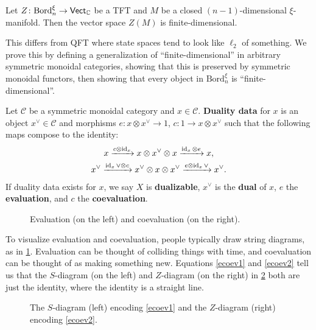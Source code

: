 \begin{theorem}\label{finitestate} 
    Let $Z \colon \mathrm{Bord}_n^{\xi} \to \mathsf{Vect} _{\mathbb{C}}$ be a TFT and $M$ be a closed $(n-1)$-dimensional $\xi$-manifold. Then the vector space $Z(M)$ is finite-dimensional.
\end{theorem}
This differs from QFT where state spaces tend to look like $\ell_2$ of something. We prove this by defining a generalization of ``finite-dimensional'' in arbitrary symmetric monoidal categories, showing that this is preserved by symmetric monoidal functors, then showing that every object in $\mathrm{Bord}_n ^{\xi}$ is ``finite-dimensional''.

\begin{definition}[]
    Let $\mathcal{C} $ be a symmetric monoidal category and $x \in \mathcal{C} $. \textbf{Duality data} for $x$ is an object $x ^{\vee} \in \mathcal{C} $ and morphisms $e \colon x \otimes x^{\vee} \to 1$, $c \colon 1 \to x \otimes x^{\vee}$ such that the following maps compose to the identity:
    \begin{gather}
       x \xrightarrow{c \otimes \operatorname{id}_x} x \otimes x^{\vee}\otimes x \xrightarrow{\operatorname{id}_x \otimes e} x,\label{ecoev1} \\ 
       x^{\vee}\xrightarrow{\operatorname{id}_x\vee \otimes c} x^{\vee}\otimes x \otimes x^{\vee}\xrightarrow{e\otimes \operatorname{id}_x \vee} x^{\vee}.\label{ecoev2} 
    \end{gather}
    If duality data exists for $x$, we say $X$ is \textbf{dualizable}, $x^{\vee}$ is the \textbf{dual} of $x$, $e$ the \textbf{evaluation}, and $c$ the \textbf{coevaluation}.
\end{definition}
\begin{figure}[h]
\centering
{}
\caption{Evaluation (on the left) and coevaluation (on the right).}
\label{ecoev}
\end{figure}
To visualize evaluation and coevaluation, people typically draw string diagrams, as in \cref{ecoev}. Evaluation can be thought of colliding things with time, and coevaluation can be thought of as making something new. Equations \eqref{ecoev1} and \eqref{ecoev2} tell us that the $S$-diagram (on the left) and $Z$-diagram (on the right) in \cref{szdiagram} both are just the identity, where the identity is a straight line.

\begin{figure}[H]
\centering
{}
\caption{The $S$-diagram (left) encoding \cref{ecoev1} and the $Z$-diagram (right) encoding \cref{ecoev2}. }
\label{szdiagram}
\end{figure}

